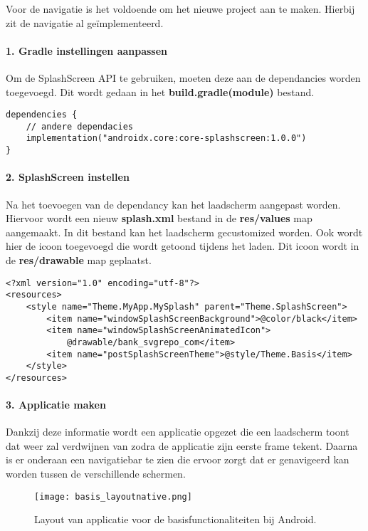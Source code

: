 Voor de navigatie is het voldoende om het nieuwe project aan te maken. 
Hierbij zit de navigatie al geïmplementeerd.

\paragraph{1. Gradle instellingen aanpassen}
Om de SplashScreen API te gebruiken, moeten deze aan de dependancies worden toegevoegd. Dit wordt gedaan in
het \textbf{build.gradle(module)} bestand.
\begin{verbatim}
dependencies {
    // andere dependacies
    implementation("androidx.core:core-splashscreen:1.0.0")
}
\end{verbatim}

\paragraph{2. SplashScreen instellen}
Na het toevoegen van de dependancy kan het laadscherm aangepast worden. 
Hiervoor wordt een nieuw \textbf{splash.xml} bestand in de \textbf{res/values} map aangemaakt. In dit 
bestand kan het laadscherm gecustomized worden. Ook wordt hier de icoon toegevoegd die wordt
getoond tijdens het laden. Dit icoon wordt in de \textbf{res/drawable} map geplaatst.
\begin{verbatim}
<?xml version="1.0" encoding="utf-8"?>
<resources>
    <style name="Theme.MyApp.MySplash" parent="Theme.SplashScreen">
        <item name="windowSplashScreenBackground">@color/black</item>
        <item name="windowSplashScreenAnimatedIcon">
            @drawable/bank_svgrepo_com</item>
        <item name="postSplashScreenTheme">@style/Theme.Basis</item>
    </style>
</resources>
\end{verbatim}

\paragraph{3. Applicatie maken}
Dankzij deze informatie wordt een applicatie opgezet die een laadscherm toont dat weer zal verdwijnen 
van zodra de applicatie zijn eerste frame tekent. Daarna is er onderaan een navigatiebar te zien die ervoor zorgt dat 
er genavigeerd kan worden tussen de verschillende schermen.
\begin{figure}[H]
    \centering
    \texttt{[image: basis\_layoutnative.png]}
    \caption{Layout van applicatie voor de basisfunctionaliteiten bij Android.}
\end{figure}
